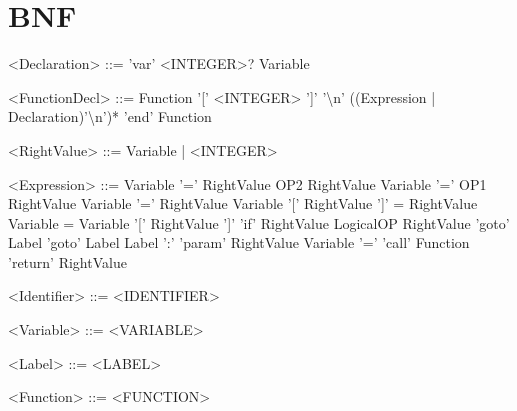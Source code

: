\documentclass{ctexart}
\newenvironment{typewriterfont}{\ttfamily}{\par}
\begin{document}
\section{BNF}
\begin{typewriterfont}
\setlength{\grammarindent}{8em} %
\begin{grammar}
<Declaration> ::= 'var' <INTEGER>? Variable

<FunctionDecl> ::= Function '[' <INTEGER> ']' '\textbackslash n' ((Expression | Declaration)'\textbackslash n')* 'end' Function

<RightValue> ::= Variable | <INTEGER>

<Expression>	::=	Variable '=' RightValue OP2 RightValue
\alt Variable '=' OP1 RightValue
\alt Variable '=' RightValue
\alt Variable '[' RightValue ']' = RightValue
\alt Variable = Variable '[' RightValue ']'
\alt 'if' RightValue LogicalOP RightValue 'goto' Label
\alt 'goto' Label
\alt Label ':'
\alt 'param' RightValue
\alt Variable '=' 'call' Function
\alt 'return' RightValue


<Identifier>	::=	<IDENTIFIER>

<Variable> ::= <VARIABLE>

<Label> ::= <LABEL>

<Function> ::= <FUNCTION>

\end{grammar}
\end{typewriterfont}
\newpage
\end{document}

